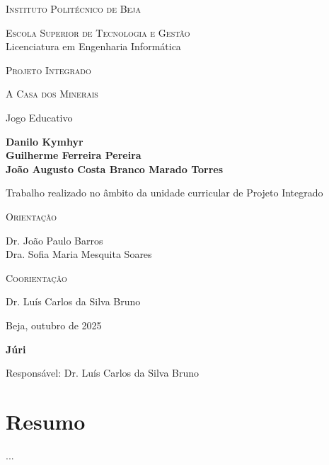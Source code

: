 \documentclass[12pt,a4paper,openright,oneside]{memoir}
\newcommand{\Institute}{Instituto Politécnico de Beja}
\newcommand{\School}{Escola Superior de Tecnologia e Gestão}
\newcommand{\Degree}{Licenciatura em Engenharia Informática}
\newcommand{\Course}{Projeto Integrado}
\newcommand{\Title}{A Casa dos Minerais}
\newcommand{\Subtitle}{Jogo Educativo}
\newcommand{\AuthorFirst}{Danilo Kymhyr}
\newcommand{\AuthorSecond}{Guilherme Ferreira Pereira}
\newcommand{\AuthorThird}{João Augusto Costa Branco Marado Torres}
\newcommand{\AdvisorFirst}{Dr. Luís Carlos da Silva Bruno}
\newcommand{\AdvisorSecond}{Dr. João Paulo Barros}
\newcommand{\AdvisorThird}{Dra. Sofia Maria Mesquita Soares}
\newcommand{\Date}{Beja, outubro de 2025}
\begin{document}
\thispagestyle{empty}
\begin{center}
    \textsc{\large \Institute}

    \bigskip

    \textsc{\large \School}\\{\large \Degree}

    \bigskip

    \textsc{\large \Course}

    \vspace{4\baselineskip}

    \textsc{\Huge \Title}

    \smallskip

    {\Large \Subtitle}

    \bigskip

    {\large\bfseries \AuthorFirst}\\
    {\large\bfseries \AuthorSecond}\\
    {\large\bfseries \AuthorThird}

    \vspace{2\baselineskip}

    {\large Trabalho realizado no âmbito da unidade curricular de \Course}

    \vspace{2\baselineskip}

    \textsc{Orientação}

    \bigskip

    \AdvisorSecond\\
    \AdvisorThird

    \bigskip

    \textsc{Coorientação}

    \bigskip

    \AdvisorFirst

    \vfill

    {\footnotesize \Date}
\end{center}

\cleardoublepage

\thispagestyle{empty}
\begin{center}
  \textbf{Júri}

  \bigskip

  Responsável: \AdvisorFirst
\end{center}
\clearpage


\chapter*{Resumo}
\noindent
...
\end{document}
